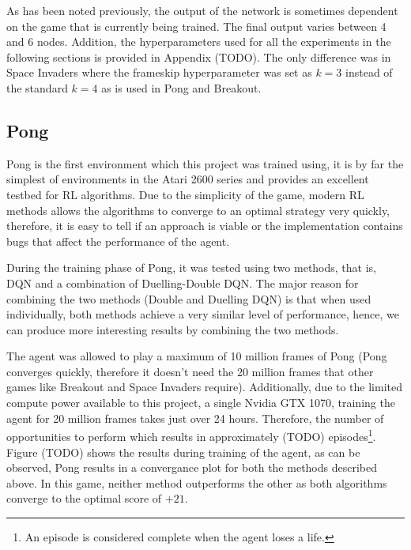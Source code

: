 As has been noted previously, the output of the network is sometimes dependent on the game that is currently being trained. The final output varies between 4 and 6 nodes. Addition, the hyperparameters used for all the experiments in the following sections is provided in Appendix (TODO). The only difference was in Space Invaders where the frameskip hyperparameter was set as $k = 3$ instead of the standard $k = 4$ as is used in Pong and Breakout.

\subsection{Pong}
Pong is the first environment which this project was trained using, it is by far the simplest of environments in the Atari 2600 series and provides an excellent testbed for RL algorithms. Due to the simplicity of the game, modern RL methods allows the algorithms to converge to an optimal strategy very quickly, therefore, it is easy to tell if an approach is viable or the implementation contains bugs that affect the performance of the agent.

During the training phase of Pong, it was tested using two methods, that is, DQN and a combination of Duelling-Double DQN. The major reason for combining the two methods (Double and Duelling DQN) is that when used individually, both methods achieve a very similar level of performance, hence, we can produce more interesting results by combining the two methods.

The agent was allowed to play a maximum of 10 million frames of Pong (Pong converges quickly, therefore it doesn't need the 20 million frames that other games like Breakout and Space Invaders require). Additionally, due to the limited compute power available to this project, a single Nvidia GTX 1070, training the agent for 20 million frames takes just over 24 hours. Therefore, the number of opportunities to perform  which results in approximately (TODO) episodes\footnote{An episode is considered complete when the agent loses a life.}. Figure (TODO) shows the results during training of the agent, as can be observed, Pong results in a convergance plot for both the methods described above. In this game, neither method outperforms the other as both algorithms converge to the optimal score of $+21$.

